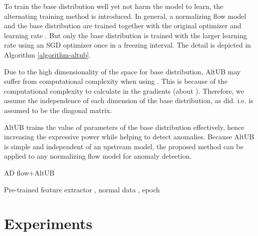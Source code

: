 \documentclass[letterpaper]{article}
\begin{document}
To train the base distribution well yet not harm the model to learn, the alternating training method is introduced. In general, a normalizing flow model and the base distribution are trained together with the original optimizer and learning rate . But only the base distribution is trained with the larger learning rate  using an SGD optimizer once in a freezing interval. The detail is depicted in Algorithm \ref{algorithm-altub}.

Due to the high dimensionality of the space for base distribution, AltUB may suffer from computational complexity when using . This is because of the computational complexity to calculate  in the gradients (about ). Therefore, we assume the independence of each dimension of the base distribution, as \cite{rudolph1, yu1, gudovskiy1} did. i.e.  is assumed to be the diagonal matrix.

AltUB trains the value of parameters of the base distribution effectively, hence increasing the expressive power while helping to detect anomalies. Because AltUB is simple and independent of an upstream model, the proposed method can be applied to any normalizing flow model for anomaly detection. 
\begin{algorithm}[t]
   \caption{AD flow+AltUB}
   \label{algorithm-altub}
\begin{algorithmic}
     Pre-trained feature extractor , normal data , epoch 
    \STATE{: } 
        \newline
        \IF{}
            \STATE 
        \ELSE
            \STATE {}
            \ENDIF
    \ENDFOR
\end{algorithmic}
\end{algorithm}

\section{Experiments}
\end{document}
